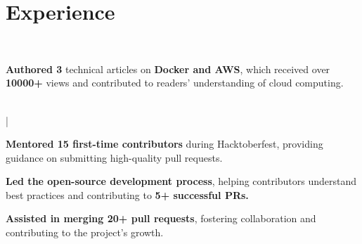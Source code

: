 \documentclass[]{deedy-resume-openfont}
\begin{document}


\section{Experience}
\vspace{0.4mm}
\hfill {} \\
\vspace{0.7mm}
\hfill {}
\vspace{1.7mm}
\begin{tightemize}
	\item \textbf{Authored 3} technical articles on \textbf{Docker and AWS}, which received over \textbf{10000+} views and contributed to readers' understanding of cloud computing.
\end{tightemize}
\sectionsep

\vspace{0.4mm} 
\hfill {} \\
\vspace{0.7mm} 
\hfill {} | 
\vspace{1.7mm}
\begin{tightemize}
	\item \textbf{Mentored 15 first-time contributors} during Hacktoberfest, providing guidance on submitting high-quality pull requests.
	\vspace{-1mm}
	\item \textbf{Led the open-source development process}, helping contributors understand best practices and contributing to \textbf{5+ successful PRs.}
	\vspace{-1mm}
	\item \textbf{Assisted in merging 20+ pull requests}, fostering collaboration and contributing to the project's growth.
\end{tightemize}
\sectionsep
\end{document}
